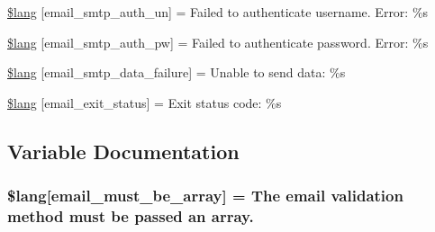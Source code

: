 \begin{DoxyCompactItemize}
\hyperlink{system_2language_2english_2email__lang_8php_a69f2fa5072f039936748571ea5cc9cba}{\$lang} \mbox{[}\textquotesingle{}email\+\_\+smtp\+\_\+auth\+\_\+un\textquotesingle{}\mbox{]} = \textquotesingle{}Failed to authenticate username. Error\+: \%s\textquotesingle{}
\item 
\hyperlink{system_2language_2english_2email__lang_8php_a09fd123f0d251a8eac845f985c6583c3}{\$lang} \mbox{[}\textquotesingle{}email\+\_\+smtp\+\_\+auth\+\_\+pw\textquotesingle{}\mbox{]} = \textquotesingle{}Failed to authenticate password. Error\+: \%s\textquotesingle{}
\item 
\hyperlink{system_2language_2english_2email__lang_8php_a59801e23c2d745400384098c7bf0a6dc}{\$lang} \mbox{[}\textquotesingle{}email\+\_\+smtp\+\_\+data\+\_\+failure\textquotesingle{}\mbox{]} = \textquotesingle{}Unable to send data\+: \%s\textquotesingle{}
\item 
\hyperlink{system_2language_2english_2email__lang_8php_a32b0c2f50acd03defc88df937ee2877f}{\$lang} \mbox{[}\textquotesingle{}email\+\_\+exit\+\_\+status\textquotesingle{}\mbox{]} = \textquotesingle{}Exit status code\+: \%s\textquotesingle{}
\end{DoxyCompactItemize}


\subsection{Variable Documentation}
\hypertarget{system_2language_2english_2email__lang_8php_ac8c4b077e854bbdbb9a37b2d7f7c47fc}{}
\subsubsection[{\$lang}]{\setlength{\rightskip}{0pt plus 5cm}\$lang\mbox{[}\textquotesingle{}email\+\_\+must\+\_\+be\+\_\+array\textquotesingle{}\mbox{]} = \textquotesingle{}The email validation method must be passed an array.\textquotesingle{}}\label{system_2language_2english_2email__lang_8php_ac8c4b077e854bbdbb9a37b2d7f7c47fc}
\hypertarget{system_2language_2english_2email__lang_8php_a37759f6c728f3aaf8df6ca5bb8a3e832}{}
